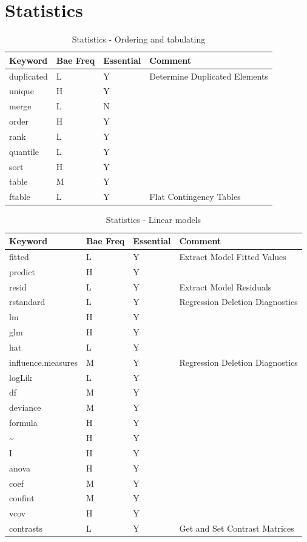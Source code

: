 \documentclass[11pt,]{krantz}
\theoremstyle{definition}
\theoremstyle{definition}
\theoremstyle{remark}
\begin{document}
\section{Statistics}\label{statistics}

\begin{longtable}[t]{llll}
\caption{\label{tab:knitchunk16}Statistics - Ordering and tabulating }\\
\toprule
Keyword & Bae Freq & Essential & Comment\\
\midrule
duplicated & L & Y & Determine Duplicated Elements\\
unique & H & Y & \\
merge & L & N & \\
order & H & Y & \\
rank & L & Y & \\
\addlinespace
quantile & L & Y & \\
sort & H & Y & \\
table & M & Y & \\
ftable & L & Y & Flat Contingency Tables\\
\bottomrule
\end{longtable}

\begin{longtable}[t]{llll}
\caption{\label{tab:knitchunk17}Statistics - Linear models }\\
\toprule
Keyword & Bae Freq & Essential & Comment\\
\midrule
fitted & L & Y & Extract Model Fitted Values\\
predict & H & Y & \\
resid & L & Y & Extract Model Residuals\\
rstandard & L & Y & Regression Deletion Diagnostics\\
lm & H & Y & \\
\addlinespace
glm & H & Y & \\
hat & L & Y & \\
influence.measures & M & Y & Regression Deletion Diagnostics\\
logLik & L & Y & \\
df & M & Y & \\
\addlinespace
deviance & M & Y & \\
formula & H & Y & \\
\textasciitilde{} & H & Y & \\
I & H & Y & \\
anova & H & Y & \\
\addlinespace
coef & M & Y & \\
confint & M & Y & \\
vcov & H & Y & \\
contrasts & L & Y & Get and Set Contrast Matrices\\
\bottomrule
\end{longtable}
\end{document}
